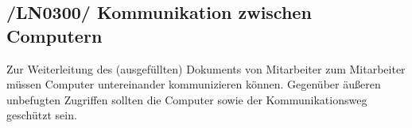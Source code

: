 \subsection{/LN0300/ Kommunikation zwischen Computern}
Zur Weiterleitung des (ausgefüllten) Dokuments von Mitarbeiter zum Mitarbeiter müssen Computer untereinander kommunizieren können. Gegenüber äußeren unbefugten Zugriffen sollten die Computer sowie der Kommunikationsweg geschützt sein.